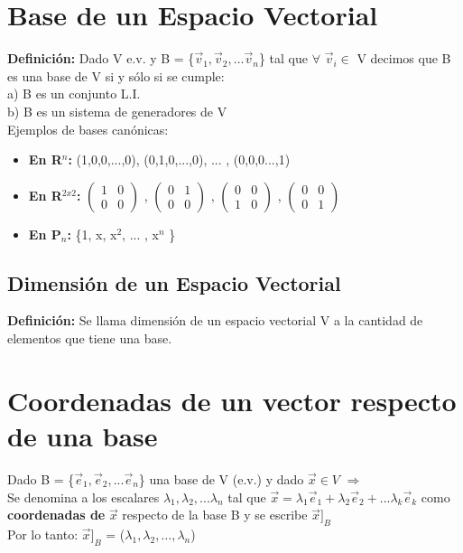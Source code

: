 \documentclass[11pt]{article}
\begin{document}
\section{Base de un Espacio Vectorial}
{\bfseries Definición:} Dado V e.v. y B = \{$\vec{v}_{1}, \vec{v}_2,... \vec{v}_n $\} tal que $\forall$ $\vec{v}_{i} \in$ V decimos que B es una base de V si y sólo si se cumple:\\
a) B es un conjunto L.I.\\
b) B es un sistema de generadores de V \\
Ejemplos de bases canónicas: 
\begin{itemize}
\item {\bfseries En R$^{n}$:} (1,0,0,...,0), (0,1,0,...,0), ... , (0,0,0...,1) 
\item {\bfseries En R$^{2x2}$:} $\begin{pmatrix} 1&0\\ 0&0 \end{pmatrix}$ , $\begin{pmatrix} 0&1\\ 0&0 \end{pmatrix}$ , $\begin{pmatrix} 0&0\\ 1&0 \end{pmatrix}$ , $\begin{pmatrix} 0&0\\ 0&1 \end{pmatrix}$ 
\item {\bfseries En P$_{n}$:} \{1, x, x$^2$, ... , x$^n$ \} 
\end{itemize}
\subsection{Dimensión de un Espacio Vectorial}
{\bfseries Definición:} Se llama dimensión de un espacio vectorial V a la cantidad de elementos que tiene una base.
\section{Coordenadas de un vector respecto de una base}
Dado B = \{$\vec{e}_{1}, \vec{e}_2,... \vec{e}_n $\} una base de V (e.v.) y dado $\vec{x} \in V$ $\Rightarrow$\\ 
Se denomina a los escalares $\lambda_{1}, \lambda_{2},... \lambda_{n}$ tal que $\vec{x} = \lambda_{1}\vec{e}_{1} + \lambda_{2}\vec{e}_{2} +... \lambda_{k}\vec{e}_{k}$ como {\bfseries coordenadas de} $\vec{x} $ respecto de la base B y se escribe $\vec{x}]_B$ \\
Por lo tanto: $\vec{x}]_B$ = ($\lambda_{1}, \lambda_{2},\hdots, \lambda_{n}$)
\newpage
\end{document}

